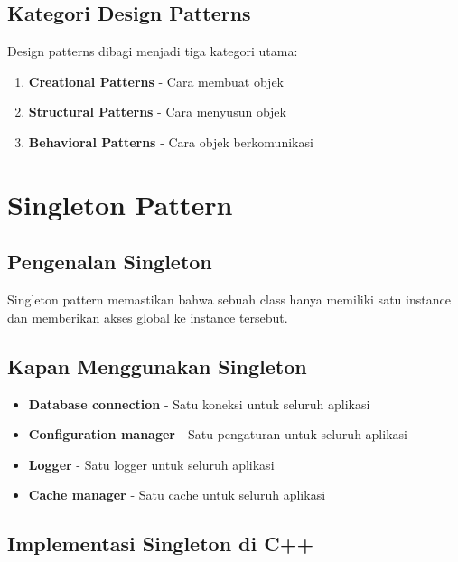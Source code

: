 \subsection{Kategori Design Patterns}

Design patterns dibagi menjadi tiga kategori utama:

\begin{enumerate}
\item \textbf{Creational Patterns} - Cara membuat objek
\item \textbf{Structural Patterns} - Cara menyusun objek
\item \textbf{Behavioral Patterns} - Cara objek berkomunikasi
\end{enumerate}

\section{Singleton Pattern}

\subsection{Pengenalan Singleton}

Singleton pattern memastikan bahwa sebuah class hanya memiliki satu instance dan memberikan akses global ke instance tersebut.

\subsection{Kapan Menggunakan Singleton}

\begin{itemize}
\item \textbf{Database connection} - Satu koneksi untuk seluruh aplikasi
\item \textbf{Configuration manager} - Satu pengaturan untuk seluruh aplikasi
\item \textbf{Logger} - Satu logger untuk seluruh aplikasi
\item \textbf{Cache manager} - Satu cache untuk seluruh aplikasi
\end{itemize}

\subsection{Implementasi Singleton di C++}


